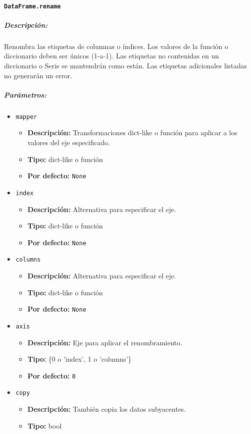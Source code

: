 \paragraph{\texttt{DataFrame.rename}}
\subparagraph{Descripción:}
Renombra las etiquetas de columnas o índices. Los valores de la función o diccionario deben ser únicos (1-a-1). Las etiquetas no contenidas en un diccionario o Serie se mantendrán como están. Las etiquetas adicionales listadas no generarán un error.
\subparagraph{Parámetros:}
\begin{itemize}
\item \texttt{mapper}
\begin{itemize}
\item \textbf{Descripción:} Transformaciones dict-like o función para aplicar a los valores del eje especificado.
\item \textbf{Tipo:} dict-like o función
\item \textbf{Por defecto:} \texttt{None}
\end{itemize}
\item \texttt{index}
\begin{itemize}
\item \textbf{Descripción:} Alternativa para especificar el eje.
\item \textbf{Tipo:} dict-like o función
\item \textbf{Por defecto:} \texttt{None}
\end{itemize}
\item \texttt{columns}
\begin{itemize}
\item \textbf{Descripción:} Alternativa para especificar el eje.
\item \textbf{Tipo:} dict-like o función
\item \textbf{Por defecto:} \texttt{None}
\end{itemize}
\item \texttt{axis}
\begin{itemize}
\item \textbf{Descripción:} Eje para aplicar el renombramiento.
\item \textbf{Tipo:} \{0 o 'index', 1 o 'columns'\}
\item \textbf{Por defecto:} \texttt{0}
\end{itemize}
\item \texttt{copy}
\begin{itemize}
\item \textbf{Descripción:} También copia los datos subyacentes.
\item \textbf{Tipo:} bool

\end{itemize}
\end{itemize}
